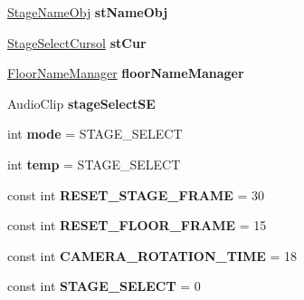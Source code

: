 \begin{DoxyCompactItemize}
\item 
\mbox{\label{class_stage_select_a52ef6611e47ae0f0f1e2f6e0f3e503f9}} 
\hyperlink{class_stage_name_obj}{Stage\+Name\+Obj} {\bfseries st\+Name\+Obj}
\item 
\mbox{\label{class_stage_select_af866e4ba0ce2bdcd1376d943c2b67a56}} 
\hyperlink{class_stage_select_cursol}{Stage\+Select\+Cursol} {\bfseries st\+Cur}
\item 
\mbox{\label{class_stage_select_a3ed60dfaf9dc3e42284899412d92f204}} 
\hyperlink{class_floor_name_manager}{Floor\+Name\+Manager} {\bfseries floor\+Name\+Manager}
\item 
\mbox{\label{class_stage_select_a9a7049916482752cfa9deffcd832471b}} 
Audio\+Clip {\bfseries stage\+Select\+SE}
\item 
\mbox{\label{class_stage_select_a966bce47b5747e1b6bdec3f95e0a13b8}} 
int {\bfseries mode} = S\+T\+A\+G\+E\+\_\+\+S\+E\+L\+E\+CT
\item 
\mbox{\label{class_stage_select_a41e282bd684f54e37de0df5d302ddad6}} 
int {\bfseries temp} = S\+T\+A\+G\+E\+\_\+\+S\+E\+L\+E\+CT
\item 
\mbox{\label{class_stage_select_a04571ee6c3e5aeaa338c910967dead4d}} 
const int {\bfseries R\+E\+S\+E\+T\+\_\+\+S\+T\+A\+G\+E\+\_\+\+F\+R\+A\+ME} = 30
\item 
\mbox{\label{class_stage_select_a562afe438af90078afece810a364e784}} 
const int {\bfseries R\+E\+S\+E\+T\+\_\+\+F\+L\+O\+O\+R\+\_\+\+F\+R\+A\+ME} = 15
\item 
\mbox{\label{class_stage_select_aaa32dce3186ffabda37dbf7680cf8d10}} 
const int {\bfseries C\+A\+M\+E\+R\+A\+\_\+\+R\+O\+T\+A\+T\+I\+O\+N\+\_\+\+T\+I\+ME} = 18
\item 
\mbox{\label{class_stage_select_ab274726f22630ba11002b99fa56d0be3}} 
const int {\bfseries S\+T\+A\+G\+E\+\_\+\+S\+E\+L\+E\+CT} = 0
\item 
\mbox{\label{class_stage_select_a43591fc54aabe56e001256c0c106f2fd}} 

\end{DoxyCompactItemize}
